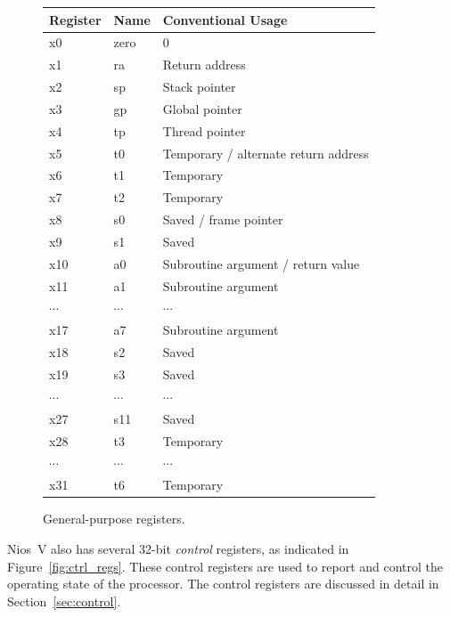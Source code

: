 \documentclass[11pt, twoside, pdftex]{article}
\begin{document}
\begin{figure}[H]
\begin{center}
\begin{tabular}{|l|l|l|} \hline 
\rule{0in}{0.1in}{\bf Register} & {\bf Name} & {\bf Conventional Usage} \\ \hline
x0 & zero & 0\\ 
x1 & ra & Return address\\ 
x2 & sp & Stack pointer\\ 
x3 & gp & Global pointer\\ 
x4 & tp & Thread pointer\\ 
x5 & t0 & Temporary / alternate return address\\ 
x6 & t1 & Temporary\\ 
x7 & t2 & Temporary\\
x8 & s0 & Saved / frame pointer\\
x9 & s1 & Saved\\
x10 & a0 & Subroutine argument / return value\\
x11 & a1 & Subroutine argument\\
$\cdots$ & $\cdots$ & $\cdots$ \\ 
x17 & a7 & Subroutine argument\\
x18 & s2 & Saved\\
x19 & s3 & Saved\\
$\cdots$ & $\cdots$ & $\cdots$ \\ 
x27 & s11 & Saved\\
x28 & t3 & Temporary\\ 
$\cdots$ & $\cdots$ & $\cdots$ \\ 
x31 & t6 & Temporary\\ \hline
\end{tabular}
\end{center}
	\caption{General-purpose registers.}
	\label{fig:gp_regs}
\end{figure}

Nios~V also has several 32-bit {\it control} registers, as indicated in
Figure~\ref{fig:ctrl_regs}. 
These control registers are used to report and control the operating state of the processor. 
The control registers are discussed in detail in Section~\ref{sec:control}. 
\end{document}
